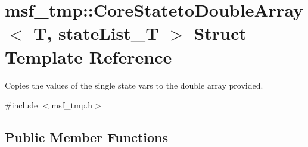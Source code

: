 \hypertarget{structmsf__tmp_1_1CoreStatetoDoubleArray}{\section{msf\-\_\-tmp\-:\-:Core\-Stateto\-Double\-Array$<$ T, state\-List\-\_\-\-T $>$ Struct Template Reference}
\label{structmsf__tmp_1_1CoreStatetoDoubleArray}
}


Copies the values of the single state vars to the double array provided.  




{\ttfamily \#include $<$msf\-\_\-tmp.\-h$>$}

\subsection*{Public Member Functions}
